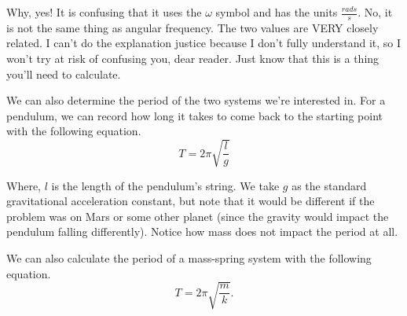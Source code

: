 Why, yes! It is confusing that it uses the $\omega$ symbol and has the units $\frac{rads}{s}$. No, it is not the same thing as angular frequency.
The two values are VERY closely related. I can't do the explanation justice because I don't fully understand it, so I won't try at risk of confusing you,
dear reader. Just know that this is a thing you'll need to calculate.

We can also determine the period of the two systems we're interested in. For a pendulum, we can record how long it takes to come back to the starting
point with the following equation.
\begin{equation}
    T = 2 \pi \sqrt{\frac{l}{g}}
\end{equation}

Where, $l$ is the length of the pendulum's string. We take $g$ as the standard gravitational acceleration constant, but note that it would be different if
the problem was on Mars or some other planet (since the gravity would impact the pendulum falling differently). Notice how mass does not impact the
period at all.

We can also calculate the period of a mass-spring system with the following equation.
\begin{equation}
    T = 2 \pi \sqrt{\frac{m}{k}}.
\end{equation}